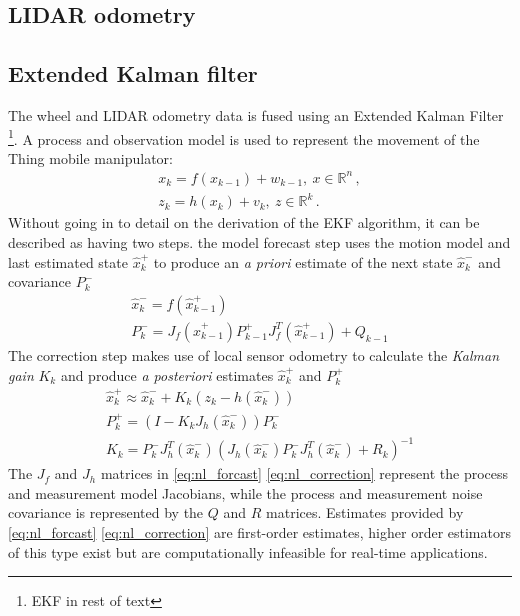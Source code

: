 \documentclass[times, utf8, diplomski, english]{fer}
\begin{document}
\subsection{LIDAR odometry}
\subsection{Extended Kalman filter}
The wheel and LIDAR odometry data is fused using an Extended Kalman Filter \footnote{EKF in rest of text}\citep{MooreStouchKeneralizedEkf2014}.
A process and observation model is used to represent the movement of the Thing mobile manipulator:
\begin{subequations}\label{state_space_nl2}
\begin{gather}
x_k = f\left(x_{k-1}\right) + w_{k-1} , \ x \in \mathbb{R}^n\, , \\
z_k = h\left(x_k\right) + v_k, \ z \in \mathbb{R}^k\, .
\end{gather}
\end{subequations}
Without going in to detail on the derivation of the EKF algorithm, it can be described as having two steps.\:
the model forecast step uses the motion model and last estimated state $\hat{x}_k^+$ to produce an \textit{a priori} estimate of the next state $\hat{x}_k^-$ and covariance $P_k^-$
\begin{subequations}\label{eq:nl_forcast}
\begin{gather}
\hat{x}_k^- = f\left(\hat{x}_{k-1}^+\right) \\
P_k^- = J_f\left(\hat{x}_{k-1}^+\right)P_{k-1}^+J_f^T\left(\hat{x}_{k-1}^+\right) + Q_{k-1}
\end{gather}
\end{subequations}
The correction step makes use of local sensor odometry to calculate the \textit{Kalman gain} $K_k$ and produce \textit{a posteriori} estimates $\hat{x}_k^+$ and $P_k^+$ 
\begin{subequations}\label{eq:nl_correction}
\begin{gather}
\hat{x}_k^+ \approx \hat{x}_k^- + K_k\left(z_k - h\left(\hat{x}_k^-\right)\right) \\
P_k^+ = \left(I - K_kJ_h\left(\hat{x}_k^-\right)\right)P_k^- \\
K_k = P_k^-J_h^T\left(\hat{x}_k^-\right)\left(J_h\left(\hat{x}_k^-\right)P_k^-J_h^T\left(\hat{x}_k^-\right) + R_k\right)^{-1} 
\end{gather}
\end{subequations}
The $J_f$ and $J_h$ matrices in \eqref{eq:nl_forcast} \eqref{eq:nl_correction} represent the process and measurement model Jacobians, while the process and measurement noise covariance is represented by the $Q$ and $R$ matrices.
Estimates provided by \eqref{eq:nl_forcast} \eqref{eq:nl_correction} are first-order estimates, higher order estimators of this type exist but are computationally infeasible for real-time applications.
\end{document}
